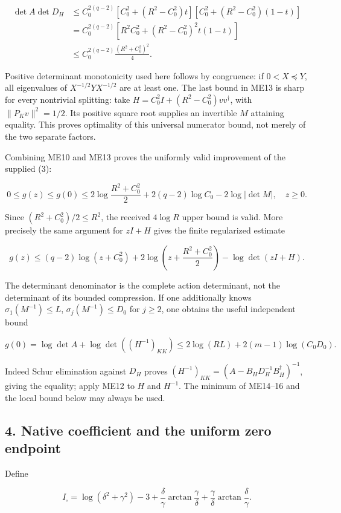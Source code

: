 \documentclass[11pt]{article}
\begin{document}
\[
\begin{aligned}
\det A\det D_H
&\le C_0^{2(q-2)}
[C_0^2+(R^2-C_0^2)t]
[C_0^2+(R^2-C_0^2)(1-t)]\\
&=C_0^{2(q-2)}[R^2C_0^2+(R^2-C_0^2)^2t(1-t)]\\
&\le C_0^{2(q-2)}\frac{(R^2+C_0^2)^2}{4}.
\end{aligned}
\tag{ME13}
\]

Positive determinant monotonicity used here follows by congruence: if \(0<X\preceq Y\), all eigenvalues of \(X^{-1/2}YX^{-1/2}\) are at least one. The last bound in ME13 is sharp for every nontrivial splitting: take \(H=C_0^2I+(R^2-C_0^2)vv^\dagger\), with \(\|P_Kv\|^2=1/2\). Its positive square root supplies an invertible \(M\) attaining equality. This proves optimality of this universal numerator bound, not merely of the two separate factors.

Combining ME10 and ME13 proves the uniformly valid improvement of the supplied (3):

\[
\boxed{0\le g(z)\le g(0)
\le 2\log\frac{R^2+C_0^2}{2}
 +2(q-2)\log C_0-2\log|\det M|,\quad z\ge0.}
\tag{ME14}
\]

Since \((R^2+C_0^2)/2\le R^2\), the received \(4\log R\) upper bound is valid. More precisely the same argument for \(zI+H\) gives the finite regularized estimate

\[
g(z)\le(q-2)\log(z+C_0^2)
 +2\log\left(z+\frac{R^2+C_0^2}{2}\right)
 -\log\det(zI+H).
\tag{ME15}
\]

The determinant denominator is the complete action determinant, not the determinant of its bounded compression. If one additionally knows \(\sigma_1(M^{-1})\le L\), \(\sigma_j(M^{-1})\le D_0\) for \(j\ge2\), one obtains the useful independent bound

\[
g(0)=\log\det A+\log\det((H^{-1})_{KK})
\le2\log(RL)+2(m-1)\log(C_0D_0).
\tag{ME16}
\]

Indeed Schur elimination against \(D_H\) proves \((H^{-1})_{KK}=(A-B_HD_H^{-1}B_H^\dagger)^{-1}\), giving the equality; apply ME12 to \(H\) and \(H^{-1}\). The minimum of ME14--16 and the local bound below may always be used.

\subsection{4. Native coefficient and the uniform zero endpoint}\label{native-coefficient-and-the-uniform-zero-endpoint}

Define

\[
I_\square=\log(\delta^2+\gamma^2)-3
 +\frac\delta\gamma\arctan\frac\gamma\delta
 +\frac\gamma\delta\arctan\frac\delta\gamma.
\tag{ME17}
\]
\end{document}
